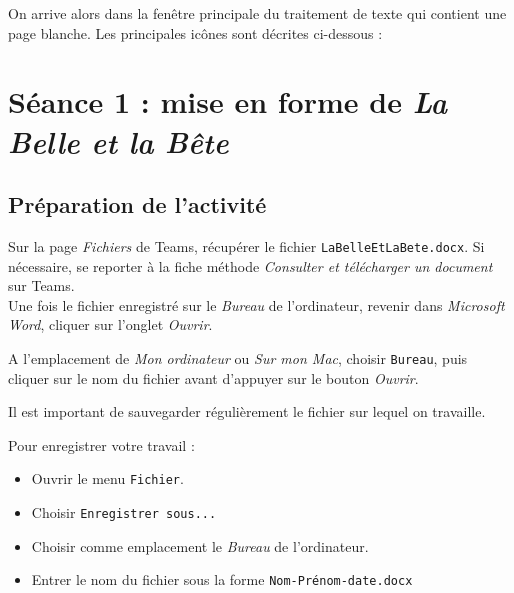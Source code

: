 
On arrive alors dans la fenêtre principale du traitement de texte qui contient une page blanche. Les principales icônes sont décrites ci-dessous :





%
%
%
%




\section{Séance 1 : mise en forme de \emph{La Belle et la Bête}}

\subsection{Préparation de l'activité}

Sur la page \emph{Fichiers} de Teams, récupérer le fichier \texttt{LaBelleEtLaBete.docx}. Si nécessaire, se reporter à la fiche méthode \emph{Consulter et télécharger un document} sur Teams.\\

Une fois le fichier enregistré sur le \emph{Bureau} de l'ordinateur, revenir dans \emph{Microsoft Word}, cliquer sur l'onglet \emph{Ouvrir}.


A l'emplacement de \emph{Mon ordinateur} ou \emph{Sur mon Mac}, choisir \texttt{Bureau}, puis cliquer sur le nom du fichier avant d'appuyer sur le bouton \emph{Ouvrir}.      






Il est important de sauvegarder régulièrement le fichier sur lequel on travaille.

Pour enregistrer votre travail :
\begin{itemize}
\item Ouvrir le menu \texttt{Fichier}.
\item Choisir \texttt{Enregistrer sous...}
\item Choisir comme emplacement le \emph{Bureau} de l'ordinateur.
\item Entrer le nom du fichier sous la forme \texttt{Nom-Prénom-date.docx}
\end{itemize}

